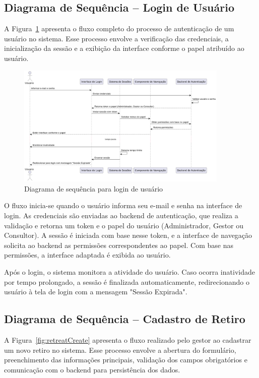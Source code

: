 \subsection{Diagrama de Sequência – Login de Usuário}

A Figura~\ref{fig:normalLogin} apresenta o fluxo completo do processo de autenticação de um usuário no sistema. Esse processo envolve a verificação das credenciais, a inicialização da sessão e a exibição da interface conforme o papel atribuído ao usuário.

\begin{figure}[H]
    \centering
    \includegraphics[width=0.9\textwidth]{images/diagramasdesequencias/normalLogin.png}
    \caption{Diagrama de sequência para login de usuário}
    \label{fig:normalLogin}
\end{figure}

O fluxo inicia-se quando o usuário informa seu e-mail e senha na interface de login. As credenciais são enviadas ao backend de autenticação, que realiza a validação e retorna um token e o papel do usuário (Administrador, Gestor ou Consultor). A sessão é iniciada com base nesse token, e a interface de navegação solicita ao backend as permissões correspondentes ao papel. Com base nas permissões, a interface adaptada é exibida ao usuário.

Após o login, o sistema monitora a atividade do usuário. Caso ocorra inatividade por tempo prolongado, a sessão é finalizada automaticamente, redirecionando o usuário à tela de login com a mensagem "Sessão Expirada".

\subsection{Diagrama de Sequência – Cadastro de Retiro}

A Figura~\ref{fig:retreatCreate} apresenta o fluxo realizado pelo gestor ao cadastrar um novo retiro no sistema. Esse processo envolve a abertura do formulário, preenchimento das informações principais, validação dos campos obrigatórios e comunicação com o backend para persistência dos dados.

